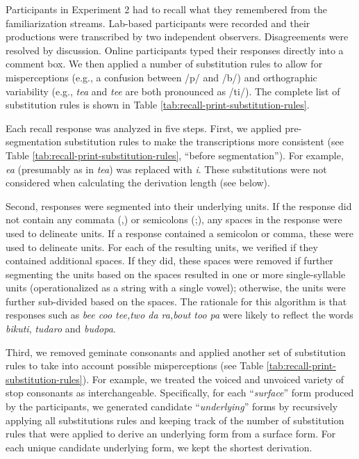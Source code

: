 \documentclass[
]{article}
\begin{document}
Participants in Experiment 2 had to recall what they remembered from the
familiarization streams. Lab-based participants were recorded and their
productions were transcribed by two independent observers. Disagreements
were resolved by discussion. Online participants typed their responses
directly into a comment box. We then applied a number of substitution
rules to allow for misperceptions (e.g., a confusion between /p/ and
/b/) and orthographic variability (e.g., \emph{tea} and \emph{tee} are
both pronounced as /ti/). The complete list of substitution rules is
shown in Table \ref{tab:recall-print-substitution-rules}.

Each recall response was analyzed in five steps. First, we applied
pre-segmentation substitution rules to make the transcriptions more
consistent (see Table \ref{tab:recall-print-substitution-rules},
``before segmentation''). For example, \emph{ea} (presumably as in
\emph{tea}) was replaced with \emph{i}. These substitutions were not
considered when calculating the derivation length (see below).

Second, responses were segmented into their underlying units. If the
response did not contain any commata (,) or semicolons (;), any spaces
in the response were used to delineate units. If a response contained a
semicolon or comma, these were used to delineate units. For each of the
resulting units, we verified if they contained additional spaces. If
they did, these spaces were removed if further segmenting the units
based on the spaces resulted in one or more single-syllable units
(operationalized as a string with a single vowel); otherwise, the units
were further sub-divided based on the spaces. The rationale for this
algorithm is that responses such as \emph{bee coo tee,two da ra,bout too
pa} were likely to reflect the words \emph{bikuti}, \emph{tudaro} and
\emph{budopa}.

Third, we removed geminate consonants and applied another set of
substitution rules to take into account possible misperceptions (see
Table \ref{tab:recall-print-substitution-rules}). For example, we
treated the voiced and unvoiced variety of stop consonants as
interchangeable. Specifically, for each ``\emph{surface}'' form produced
by the participants, we generated candidate ``\emph{underlying}'' forms
by recursively applying all substitutions rules and keeping track of the
number of substitution rules that were applied to derive an underlying
form from a surface form. For each unique candidate underlying form, we
kept the shortest derivation.
\end{document}

